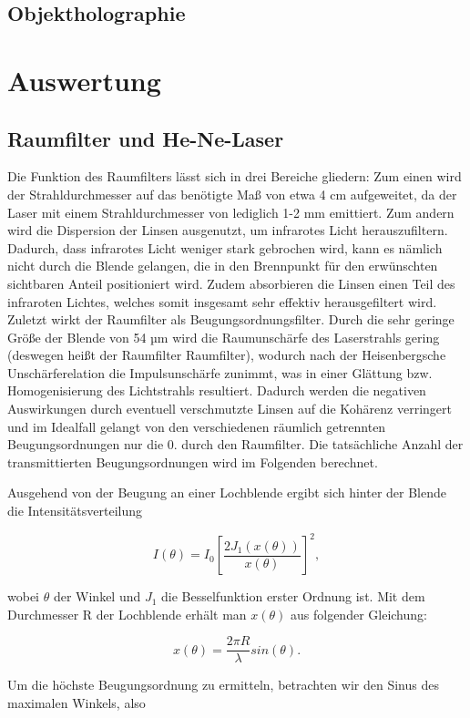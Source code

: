 \documentclass[bigchapter,colorback,accentcolor=tud4b,linedtoc,11pt]{tudreport}
\begin{document}
\section{Objektholographie}

\chapter{Auswertung}

\section{Raumfilter und He-Ne-Laser}

Die Funktion des Raumfilters lässt sich in drei Bereiche gliedern: Zum einen wird der Strahldurchmesser auf das benötigte Maß von etwa 4 cm aufgeweitet, da der Laser mit einem Strahldurchmesser von lediglich 1-2 mm emittiert. Zum andern wird die Dispersion der Linsen ausgenutzt, um infrarotes Licht herauszufiltern. Dadurch, dass infrarotes Licht weniger stark gebrochen wird, kann es nämlich nicht durch die Blende gelangen, die in den Brennpunkt für den erwünschten sichtbaren Anteil positioniert wird. Zudem absorbieren die Linsen einen Teil des infraroten Lichtes, welches somit insgesamt sehr effektiv herausgefiltert wird. Zuletzt wirkt der Raumfilter als Beugungsordnungsfilter. Durch die sehr geringe Größe der Blende von 54 µm wird die Raumunschärfe des Laserstrahls gering (deswegen heißt der Raumfilter Raumfilter), wodurch nach der Heisenbergsche Unschärferelation die Impulsunschärfe zunimmt, was in einer Glättung bzw. Homogenisierung des Lichtstrahls resultiert. Dadurch werden die negativen Auswirkungen durch eventuell verschmutzte Linsen auf die Kohärenz verringert und im Idealfall gelangt von den verschiedenen räumlich getrennten Beugungsordnungen nur die 0. durch den Raumfilter. Die tatsächliche Anzahl der transmittierten Beugungsordnungen wird im Folgenden berechnet.

Ausgehend von der Beugung an einer Lochblende ergibt sich hinter der Blende die Intensitätsverteilung

$$I(\theta) = I_0 \left[ \frac{2 J_1(x(\theta))}{x(\theta)} \right]^2,$$

wobei $\theta$ der Winkel und $J_1$ die Besselfunktion erster Ordnung ist. Mit dem Durchmesser R der Lochblende erhält man $x(\theta)$ aus folgender Gleichung: 

$$x(\theta) = \frac{2 \pi R}{\lambda} sin(\theta).$$

Um die höchste Beugungsordnung zu ermitteln, betrachten wir den Sinus des maximalen Winkels, also
\end{document}
